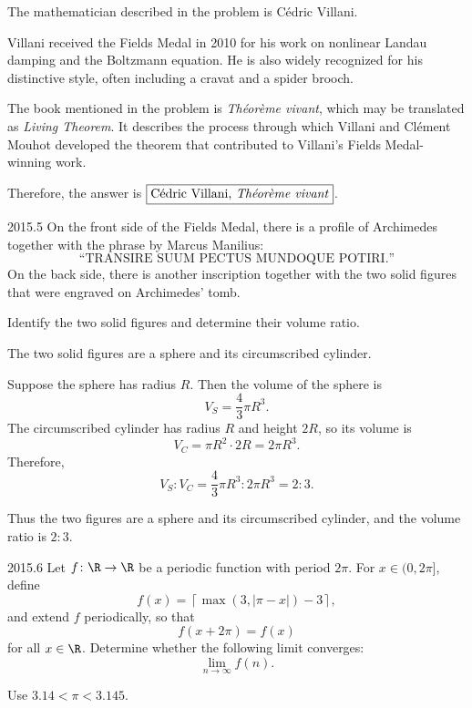     \begin{solution}
        The mathematician described in the problem is C\'edric Villani.

        Villani received the Fields Medal in 2010 for his work on nonlinear Landau damping and the
        Boltzmann equation. He is also widely recognized for his distinctive style, often including
        a cravat and a spider brooch.

        The book mentioned in the problem is \textit{Th\'eor\`eme vivant}, which may be translated
        as \textit{Living Theorem}. It describes the process through which Villani and Cl\'ement
        Mouhot developed the theorem that contributed to Villani's Fields Medal-winning work.

        Therefore, the answer is $\boxed{\text{C\'edric Villani, \textit{Th\'eor\`eme vivant}}}$.
    \end{solution}

    \begin{pastproblem}{2015.5}
        On the front side of the Fields Medal, there is a profile of Archimedes together with the
        phrase by Marcus Manilius:
        \[
            \text{``TRANSIRE SUUM PECTUS MUNDOQUE POTIRI.''}
        \]
        On the back side, there is another inscription together with the two solid figures that were
        engraved on Archimedes' tomb.

        Identify the two solid figures and determine their volume ratio.
    \end{pastproblem}

    \begin{solution}
        The two solid figures are a sphere and its circumscribed cylinder.

        Suppose the sphere has radius $R$. Then the volume of the sphere is
        \[
            V_S=\frac{4}{3}\pi R^3.
        \]
        The circumscribed cylinder has radius $R$ and height $2R$, so its volume is
        \[
            V_C=\pi R^2\cdot 2R=2\pi R^3.
        \]
        Therefore,
        \[
            V_S:V_C
            =
            \frac{4}{3}\pi R^3:2\pi R^3
            =
            2:3.
        \]

        Thus the two figures are a sphere and its circumscribed cylinder, and the volume ratio is
        $\boxed{2:3}$.
    \end{solution}

    \begin{pastproblem}{2015.6}
        Let $f\colon\R\to\R$ be a periodic function with period $2\pi$. For $x\in(0,2\pi]$, define
        \[
            f(x)
            =
            \left\lceil
                \max(3,|\pi-x|)-3
            \right\rceil,
        \]
        and extend $f$ periodically, so that
        \[
            f(x+2\pi)=f(x)
        \]
        for all $x\in\R$. Determine whether the following limit converges:
        \[
            \lim\limits_{n\to\infty} f(n).
        \]

        \begin{hint}
            Use $3.14<\pi<3.145$.
        \end{hint}
    \end{pastproblem}

